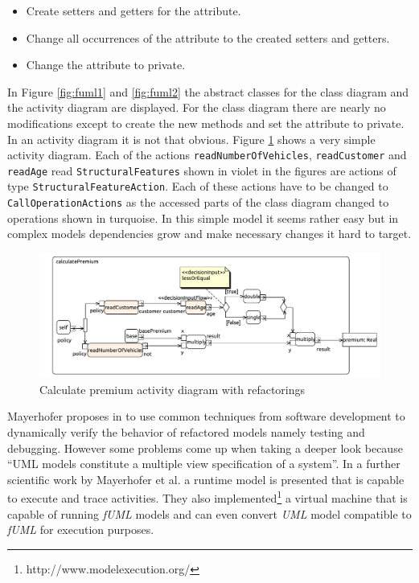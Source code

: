 \documentclass{llncs}
\begin{document}
\begin{itemize}
 \item Create setters and getters for the attribute.
 \item Change all occurrences of the attribute to the created setters and getters.
 \item Change the attribute to private.
\end{itemize}

In Figure \ref{fig:fuml1} and \ref{fig:fuml2} the abstract classes for the class diagram and the activity diagram are
displayed. For the class diagram there are nearly no modifications except to create the new methods and set the
attribute to private. In an activity diagram it is not that obvious. Figure \ref{fig:calculatePremiumRef} shows a very
simple activity diagram. Each of the actions \lstinline|readNumberOfVehicles|, \lstinline|readCustomer| and
\lstinline|readAge| read \lstinline|StructuralFeatures| shown in violet in the figures are actions of type
\lstinline|StructuralFeatureAction|. Each of these actions have to be changed to \lstinline|CallOperationActions| as the
accessed parts of the class diagram changed to operations shown in turquoise. In this simple model it seems rather easy
but in complex models dependencies grow and make necessary changes it hard to target.

\begin{figure}[h!t]
 \centering
 \includegraphics[scale=0.5]{images/insurance_ref/Activity_calculatePremium_calculatePremium}
 \caption{Calculate premium activity diagram with refactorings}
 \label{fig:calculatePremiumRef}
\end{figure}

Mayerhofer proposes in \cite{DBLP:conf/icse/Mayerhofer12} to use common techniques from software development to
dynamically verify the behavior of refactored models namely testing and debugging. However some problems come up when
taking a deeper look because ``UML models constitute a multiple view specification of a system''. In a further
scientific work by Mayerhofer et al. \cite{DBLP:conf/models/MayerhoferLK12} a runtime model is presented that is capable
to execute and trace activities. They also implemented\footnote{http://www.modelexecution.org/} a virtual machine that
is capable of running \textit{fUML} models and can even convert \textit{UML} model compatible to \textit{fUML} for
execution purposes.
\end{document}
